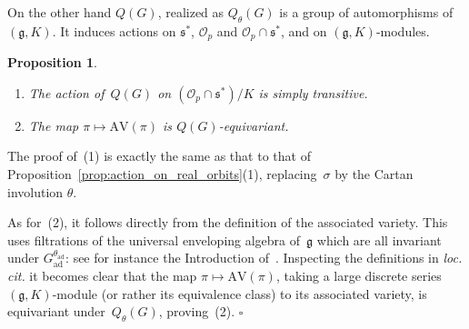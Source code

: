 \documentclass[10pt,leqno]{article}
\newtheorem{proposition}[equation]{Proposition}
\newcommand{\qed}{\hfill $\square$ \medskip}
\newcommand{\kernel}{\mathrm{kernel}}
\newcommand{\ad}{\mathrm{ad}}
\newcommand{\Gad}{G_\mathrm{ad}}
\newcommand{\Stab}{\mathrm{Stab}}
\renewcommand{\O}{\mathcal O}
\newcommand{\R}{\mathbb R}
\newcommand{\g}{\mathfrak g}
\newcommand{\s}{\mathfrak s}
\newcommand{\AV}{\mathrm{AV}}
\newcommand{\Op}{\O_p}
\begin{document}

On the other hand $Q(G)$, realized as $Q_\theta(G)$ is a group of automorphisms of $(\g,K)$.
It induces actions on $\s^*$, $\Op$ and $\Op\cap\s^*$, and on $(\g,K)$-modules.

\begin{proposition}\label{prop:action_on_K_orbits}
\begin{enumerate} 
\item The action of~$Q(G)$ on $(\Op \cap \s^*)/K$ is simply transitive.
\item The map $\pi \mapsto \AV(\pi)$ is $Q(G)$-equivariant.
\end{enumerate}
\end{proposition}

The proof of~(1) is exactly the same as that  to that of Proposition~\ref{prop:action_on_real_orbits}(1), replacing~$\sigma$ by the Cartan involution $\theta$.

As for~(2), it follows directly from the definition of the associated variety. This uses filtrations of the universal enveloping algebra of~$\g$ which are all invariant under $\Gad^{\theta_{\ad}}$: see for instance the Introduction of~\cite{vogan_bowdoin}. Inspecting the definitions in \emph{loc. cit.} it becomes clear that the map $\pi \mapsto \AV(\pi)$, taking a large discrete series $(\g,K)$-module  (or rather its equivalence class) to its associated variety, is equivariant under~$Q_{\theta}(G)$, proving~(2). 
\qed
\end{document}
